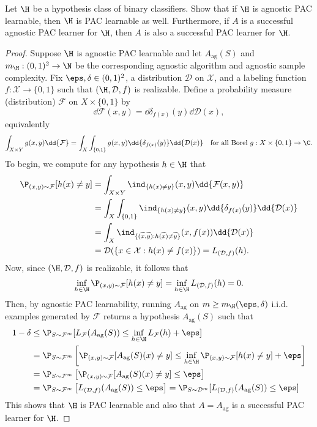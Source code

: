\documentclass[12pt]{article}
\begin{document}
\begin{homeworkProblem}
  Let $ \H $ be a hypothesis class of binary classifiers. Show that if $ \H $ is agnostic PAC learnable, then $ \H $ is PAC learnable as well. Furthermore, if $ A $ is a successful agnostic PAC learner for $ \H $, then $ A $ is also a successful PAC learner for $ \H $.
\end{homeworkProblem}

\begin{proof}
  Suppose $ \H $ is agnostic PAC learnable and let $ A_{\text{ag}}(S) $ and $ m_{\H}:(0,1)^{2}\to \N $ be the corresponding agnostic algorithm and agnostic sample complexity. Fix $ \eps,\delta\in (0,1)^{2} $, a distribution $ \mathcal{D} $ on $ \mathcal{X} $, and a labeling function $ f:\mathcal{X}\to\{0,1\} $ such that $ (\H, \mathcal{D}, f) $ is realizable. Define a probability measure (distribution) $ \mathcal{F} $ on $ X\times \{0,1\} $ by 
  \[
    \dd{\mathcal{F}(x,y)} = \dd{\delta_{f(x)}(y)}\dd{\mathcal{D}(x)},
  \]  
  equivalently 
  \[
    \int_{X\times Y} g(x,y) \dd{\mathcal{F}} = \int_{X}\int_{\{0,1\}}g(x,y) \dd{\delta_{f(x)}(y)}\dd{\mathcal{D}(x)} \quad \text{for all Borel }g:X\times\{0,1\}\to \C.
  \]
  To begin, we compute for any hypothesis $ h\in \H $ that
  \begin{align*}
    \P_{(x,y)\sim \mathcal{F}}[h(x)\neq y] &= \int_{X\times Y} \ind_{\{h(x)\neq y \}}(x,y) \dd{\mathcal{F}(x,y)} \\
    &= \int_{X} \int_{\{0,1\}} \ind_{\{h(x)\neq y \}}(x,y) \dd{\delta_{f(x)}(y)}\dd{\mathcal{D}(x)} \\
    &= \int_{X}  \ind_{\{(\widetilde{x},\widetilde{y}): h(\widetilde{x})\neq \widetilde{y} \}}(x,f(x)) \dd{\mathcal{D}(x)} \\
    &= \mathcal{D}(\{x\in \mathcal{X} : h(x)\neq f(x)\}) = L_{(\mathcal{D},f)}(h).
  \end{align*}
  Now, since $ (\H,\mathcal{D},f) $ is realizable, it follows that
  \[
    \inf_{h\in\H}\P_{(x,y)\sim \mathcal{F}}[h(x)\neq y] = \inf_{h\in \H} L_{(\mathcal{D},f)}(h) = 0.
  \]
  Then, by agnostic PAC learnability, running $ A_{\text{ag}} $ on $ m\geq m_{\H}(\eps,\delta) $ i.i.d. examples generated by $ \mathcal{F} $ returns a hypothesis $ A_{\text{ag}}(S) $ such that 
  \begin{align*}
    1-\delta&\leq \P_{S\sim \mathcal{F}^{m}}[L_{\mathcal{F}}(A_{\text{ag}}(S)) \leq \inf_{h\in \H} L_{\mathcal{F}}(h)+\eps] \\
    &=\P_{S\sim \mathcal{F}^{m}}\left[\P_{(x,y)\sim \mathcal{F}}[A_{\text{ag}}(S)(x)\neq y] \leq \inf_{h\in \H} \P_{(x,y)\sim \mathcal{F}}[h(x)\neq y]+\eps\right] \\
    &=\P_{S\sim \mathcal{F}^{m}}\left[\P_{(x,y)\sim \mathcal{F}}[A_{\text{ag}}(S)(x)\neq y] \leq \eps\right] \\
    &=\P_{S\sim \mathcal{F}^{m}}\left[L_{(\mathcal{D},f)}(A_{\text{ag}}(S)) \leq \eps\right]= \P_{S\sim \mathcal{D}^{m}}[L_{(\mathcal{D},f)}(A_{\text{ag}}(S)) \leq \eps]
  \end{align*}
  This shows that $ \H $ is PAC learnable and also that $ A=A_{\text{ag}} $ is a successful PAC learner for $ \H $.

\end{proof}
\end{document}
